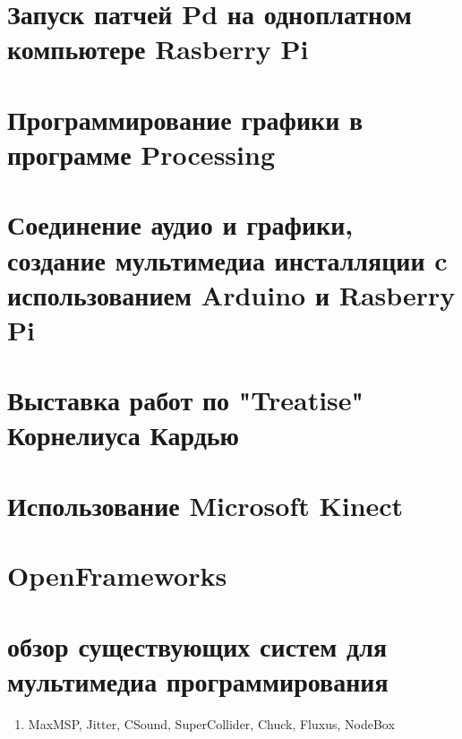 \documentclass[12pt]{article}
\begin{document}
\section{Запуск патчей Pd на одноплатном компьютере Rasberry Pi}

\section{Программирование графики в программе Processing}

\section{Соединение аудио и графики, создание мультимедиа инсталляции c использованием Arduino и Rasberry Pi}

\section{Выставка работ по "Treatise" Корнелиуса Кардью}

\section{Использование Microsoft Kinect}

\section{OpenFrameworks}

\section{обзор существующих систем для мультимедиа программирования}
\begin{enumerate}
	\item MaxMSP, Jitter, CSound, SuperCollider, Chuck, Fluxus, NodeBox
\end{enumerate}
\end{document}
